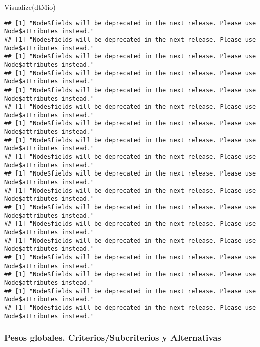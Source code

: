 \documentclass[
]{article}
\newenvironment{Shaded}{\begin{snugshade}}{\end{snugshade}}
\newcommand{\FunctionTok}[1]{\textcolor[rgb]{0.00,0.00,0.00}{#1}}
\newcommand{\NormalTok}[1]{#1}
\begin{document}
\begin{Shaded}
\begin{Highlighting}[]
\FunctionTok{Visualize}\NormalTok{(dtMio)}
\end{Highlighting}
\end{Shaded}

\begin{verbatim}
## [1] "Node$fields will be deprecated in the next release. Please use Node$attributes instead."
## [1] "Node$fields will be deprecated in the next release. Please use Node$attributes instead."
## [1] "Node$fields will be deprecated in the next release. Please use Node$attributes instead."
## [1] "Node$fields will be deprecated in the next release. Please use Node$attributes instead."
## [1] "Node$fields will be deprecated in the next release. Please use Node$attributes instead."
## [1] "Node$fields will be deprecated in the next release. Please use Node$attributes instead."
## [1] "Node$fields will be deprecated in the next release. Please use Node$attributes instead."
## [1] "Node$fields will be deprecated in the next release. Please use Node$attributes instead."
## [1] "Node$fields will be deprecated in the next release. Please use Node$attributes instead."
## [1] "Node$fields will be deprecated in the next release. Please use Node$attributes instead."
## [1] "Node$fields will be deprecated in the next release. Please use Node$attributes instead."
## [1] "Node$fields will be deprecated in the next release. Please use Node$attributes instead."
## [1] "Node$fields will be deprecated in the next release. Please use Node$attributes instead."
## [1] "Node$fields will be deprecated in the next release. Please use Node$attributes instead."
## [1] "Node$fields will be deprecated in the next release. Please use Node$attributes instead."
## [1] "Node$fields will be deprecated in the next release. Please use Node$attributes instead."
## [1] "Node$fields will be deprecated in the next release. Please use Node$attributes instead."
## [1] "Node$fields will be deprecated in the next release. Please use Node$attributes instead."
\end{verbatim}

\hypertarget{pesos-globales.-criteriossubcriterios-y-alternativas}{%
\subsubsection{Pesos globales. Criterios/Subcriterios y
Alternativas}\label{pesos-globales.-criteriossubcriterios-y-alternativas}}
\end{document}
